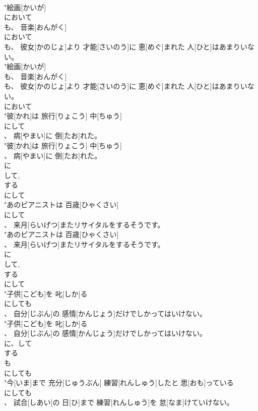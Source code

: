 \documentclass[8pt]{extreport}
\begin{document}
\begin{CJK}{UTF8}{min}
\\	"絵画[かいが]
\\	において
\\	も、 音楽[おんがく]
\\	において
\\	も、 彼女[かのじょ]より 才能[さいのう]に 恵[めぐ]まれた 人[ひと]はあまりいない。
\\	"絵画[かいが]
\\	も、 音楽[おんがく]
\\	も、 彼女[かのじょ]より 才能[さいのう]に 恵[めぐ]まれた 人[ひと]はあまりいない。
\\	において
\\	"彼[かれ]は 旅行[りょこう] 中[ちゅう]
\\	にして
\\	、 病[やまい]に 倒[たお]れた。
\\	"彼[かれ]は 旅行[りょこう] 中[ちゅう]
\\	、 病[やまい]に 倒[たお]れた。
\\	に 
\\	して, 
\\	する 
\\	にして
\\	"あのピアニストは 百歳[ひゃくさい]
\\	にして
\\	、 来月[らいげつ]またリサイタルをするそうです。
\\	"あのピアニストは 百歳[ひゃくさい]
\\	、 来月[らいげつ]またリサイタルをするそうです。
\\	に 
\\	して, 
\\	する 
\\	にして
\\	"子供[こども]を 叱[しか]る
\\	にしても
\\	、 自分[じぶん]の 感情[かんじょう]だけでしかってはいけない。
\\	"子供[こども]を 叱[しか]る
\\	、 自分[じぶん]の 感情[かんじょう]だけでしかってはいけない。
\\	に、して 
\\	する 
\\	も	
\\	にしても
\\	"今[いま]まで 充分[じゅうぶん] 練習[れんしゅう]したと 思[おも]っている
\\	にしても
\\	、 試合[しあい]の 日[ひ]まで 練習[れんしゅう]を 怠[なま]けていけない。

\end{CJK}
\end{document}
